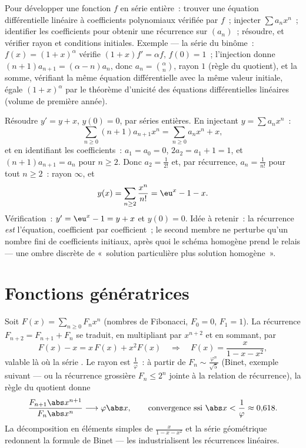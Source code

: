 \begin{method}\label{met:b2:powerseries:ode}
Pour développer une fonction $f$ en série entière~: trouver une
équation différentielle linéaire à coefficients polynomiaux
vérifiée par $f$~; injecter $\sum a_nx^n$~; identifier les
coefficients pour obtenir une récurrence sur $(a_n)$~; résoudre, et
vérifier rayon et conditions initiales. Exemple --- la série
du binôme~: $f(x) = (1+x)^\alpha$ vérifie $(1+x)f' = \alpha f$, $f(0)
= 1$~; l'injection donne $(n+1)a_{n+1} = (\alpha - n)a_n$, donc $a_n =
\binom{\alpha}{n}$, rayon $1$ (règle du quotient), et la somme,
vérifiant la même équation différentielle avec la même valeur
initiale, égale $(1 + x)^\alpha$
par le théorème d'unicité des équations différentielles linéaires
(volume de première année).
\end{method}

\begin{example}\label{ex:b2:powerseries:odeforced}
Résoudre $y' = y + x$, $y(0) = 0$, par séries entières. En injectant
$y = \sum a_nx^n$~:
\[
\sum_{n\geq0}(n+1)a_{n+1}x^n
= \sum_{n\geq0}a_nx^n + x ,
\]
et en identifiant les coefficients~: $a_1 = a_0 = 0$, $2a_2 = a_1 + 1
= 1$, et $(n+1)a_{n+1} = a_n$ pour $n \geq 2$. Donc $a_2 =
\frac{1}{2!}$ et, par récurrence, $a_n = \frac{1}{n!}$ pour tout
$n \geq 2$~: rayon $\infty$, et
\[
y(x) = \sum_{n\geq2}\frac{x^n}{n!} = \eu^x - 1 - x .
\]
Vérification~: $y' = \eu^x - 1 = y + x$ et $y(0) = 0$. Idée à
retenir~: la récurrence \emph{est} l'équation, coefficient par
coefficient~; le second membre ne perturbe qu'un nombre fini de
coefficients initiaux, après quoi le schéma homogène prend le
relais --- une ombre discrète de «~solution particulière plus
solution homogène~».
\end{example}

\section{Fonctions génératrices}

\begin{example}[Fibonacci]\label{ex:b2:powerseries:fibonacci}
Soit $F(x) = \sum_{n\geq0} F_n x^n$ (nombres de Fibonacci, $F_0 = 0$,
$F_1 = 1$). La récurrence $F_{n+2} = F_{n+1} + F_n$ se traduit,
en multipliant par $x^{n+2}$ et en sommant, par
\[
F(x) - x = x\,F(x) + x^2 F(x)
\quad\Longrightarrow\quad
F(x) = \frac{x}{1 - x - x^2} ,
\]
valable là où la série . Le rayon est
$\frac{1}{\varphi}$~: à partir de $F_n \sim
\frac{\varphi^n}{\sqrt5}$ (Binet, exemple suivant --- ou la
récurrence grossière $F_n \leq 2^n$ jointe à la relation de
récurrence), la règle du quotient donne
\[
\frac{F_{n+1}\abs x^{n+1}}{F_n\abs x^n}
\longrightarrow \varphi\abs x ,
\qquad\text{convergence ssi } \abs x < \frac1\varphi
\approx 0{,}618 .
\] La décomposition en éléments simples de
$\frac{x}{1 - x - x^2}$ et la série géométrique redonnent la formule
de Binet --- les  industrialisent les
récurrences linéaires.
\end{example}

